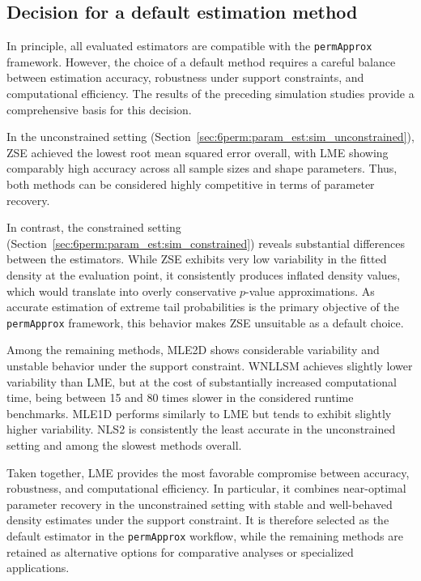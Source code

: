 \subsection{Decision for a default estimation method}
\label{sec:6perm:param_est:decision}

In principle, all evaluated estimators are compatible with the \texttt{permApprox} framework. 
However, the choice of a default method requires a careful balance between estimation accuracy, robustness under support constraints, and computational efficiency. The results of the preceding simulation studies provide a comprehensive basis for this decision.

In the unconstrained setting (Section~\ref{sec:6perm:param_est:sim_unconstrained}), ZSE achieved the lowest root mean squared error overall, with LME showing comparably high accuracy across all sample sizes and shape parameters. Thus, both methods can be considered highly competitive in terms of parameter recovery.

In contrast, the constrained setting (Section~\ref{sec:6perm:param_est:sim_constrained}) reveals substantial differences between the estimators. While ZSE exhibits very low variability in the fitted density at the evaluation point, it consistently produces inflated density values, which would translate into overly conservative $p$-value approximations. As accurate estimation of extreme tail probabilities is the primary objective of the \texttt{permApprox} framework, this behavior makes ZSE unsuitable as a default choice.

Among the remaining methods, MLE2D shows considerable variability and unstable behavior under the support constraint. WNLLSM achieves slightly lower variability than LME, but at the cost of substantially increased computational time, being between 15 and 80 times slower in the considered runtime benchmarks. MLE1D performs similarly to LME but tends to exhibit slightly higher variability. NLS2 is consistently the least accurate in the unconstrained setting and among the slowest methods overall.

Taken together, LME provides the most favorable compromise between accuracy, robustness, and computational efficiency. In particular, it combines near-optimal parameter recovery in the unconstrained setting with stable and well-behaved density estimates under the support constraint. It is therefore selected as the default estimator in the \texttt{permApprox} workflow, while the remaining methods are retained as alternative options for comparative analyses or specialized applications.

